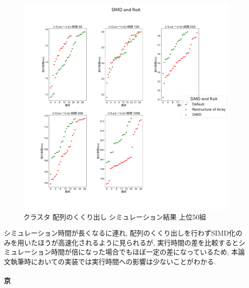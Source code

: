 \begin{figure}[htb]
\begin{center}
    \includegraphics[width=14cm]{./images/cluster-top50-SIMD-and-RoA.pdf}
    \caption{クラスタ 配列のくくり出し シミュレーション結果 上位50組}
    \label{fig:cluster-roa-top50}
\end{center}
\end{figure}
シミュレーション時間が長くなるに連れ,
配列のくくり出しを行わずSIMD化のみを用いたほうが高速化されるように見られるが,
実行時間の差を比較するとシミュレーション時間が倍になった場合でもほぼ一定の差になっているため,
本論文執筆時においての実装では実行時間への影響は少ないことがわかる.\\

\paragraph{京}~\\
